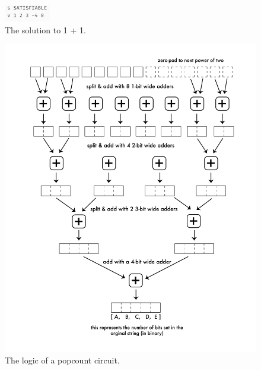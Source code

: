 \begin{figure}
    \centerline{\includegraphics[origin=c,width=2cm]{fig_one_plus_one_sol}}
    \caption{The solution to 1 + 1.}%
    \label{fig:one_plus_one_sol}%
\end{figure}

\begin{figure}
    \centerline{\includegraphics[origin=c,width=15cm]{fig_popcount}}
    \caption{The logic of a popcount circuit.}%
    \label{fig:popcount}%
\end{figure}
